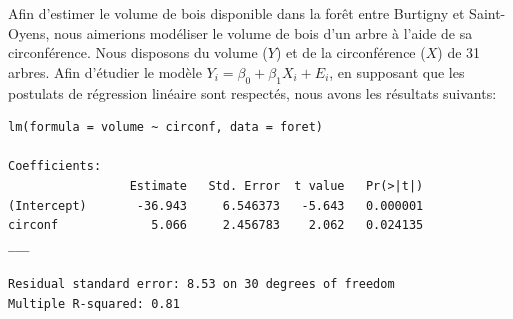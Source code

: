 \begin{questions}
\begin{parts}
\begin{checkboxes}
 \end{checkboxes}\medskip
    
\end{parts}

\pageblanche


\question
Afin d'estimer le volume de bois disponible dans la forêt entre Burtigny et Saint-Oyens, nous aimerions modéliser le volume de bois d'un arbre à l'aide de sa circonférence. Nous disposons du volume ($Y$) et de la circonférence ($X$) de 31 arbres. Afin d'étudier le modèle $Y_i = \beta_0 + \beta_1 X_i + E_i$, en supposant que les postulats de régression linéaire sont respectés, nous avons les résultats suivants:

\begin{verbatim}
lm(formula = volume ~ circonf, data = foret)

Coefficients:
                 Estimate   Std. Error  t value   Pr(>|t|)
(Intercept)       -36.943     6.546373   -5.643   0.000001
circonf             5.066     2.456783    2.062   0.024135
___

Residual standard error: 8.53 on 30 degrees of freedom
Multiple R-squared: 0.81
\end{verbatim}


\end{questions}
